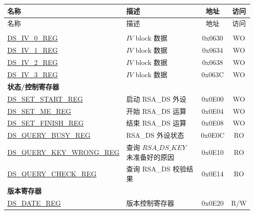 


\begin{longtable}{ | p{5.2cm} | p{6.6cm} | c| c| }
\hline\rowcolor{lightgray}
名称 & 描述 &  地址 & 访问 \\ \hline
\endfirsthead
        \hline
        \rowcolor{lightgray}
名称 & 描述 &  地址 & 访问 \\ \hline

        \endhead
        \endfoot
\multicolumn{4}{|l|}{\textbf{配置寄存器}} \\ \hline
\hyperref[regdesc:DSIVREG]{DS\_IV\_0\_REG}               & \begin{math}IV\end{math} block 数据         & 0x0630 & WO \\ \hline
\hyperref[regdesc:DSIVREG]{DS\_IV\_1\_REG}               & \begin{math}IV\end{math} block 数据          & 0x0634 & WO \\ \hline
\hyperref[regdesc:DSIVREG]{DS\_IV\_2\_REG}               & \begin{math}IV\end{math} block 数据          & 0x0638 & WO \\ \hline
\hyperref[regdesc:DSIVREG]{DS\_IV\_3\_REG}               & \begin{math}IV\end{math} block 数据           & 0x063C & WO \\ \hline
\multicolumn{4}{|l|}{\textbf{状态/控制寄存器}} \\ \hline
\hyperref[regdesc:DSSETSTARTREG]{DS\_SET\_START\_REG}               & 启动 RSA\_DS 外设     & 0x0E00 & WO \\ \hline
\hyperref[regdesc:DSSETMEREG]{DS\_SET\_ME\_REG}                     & 开始 RSA\_DS 运算       & 0x0E04 & WO \\ \hline
\hyperref[regdesc:DSSETFINISHREG]{DS\_SET\_FINISH\_REG}             & 结束 RSA\_DS 运算         & 0x0E08 & WO \\ \hline
\hyperref[regdesc:DSQUERYBUSYREG]{DS\_QUERY\_BUSY\_REG}             & RSA\_DS 外设状态& 0x0E0C & RO \\ \hline
\hyperref[regdesc:DSQUERYKEYWRONGREG]{DS\_QUERY\_KEY\_WRONG\_REG}   & 查询 \begin{math}RSA\_DS\_KEY\end{math} 未准备好的原因       & 0x0E10 & RO \\ \hline
\hyperref[regdesc:DSQUERYCHECKREG]{DS\_QUERY\_CHECK\_REG}           & 查询 RSA\_DS 校验结果    & 0x0E14 & RO \\ \hline
\multicolumn{4}{|l|}{\textbf{版本寄存器}} \\ \hline
\hyperref[regdesc:DSDATEREG]{DS\_DATE\_REG}                   & 版本控制寄存器   & 0x0E20 & R/W \\ \hline
\end{longtable}

